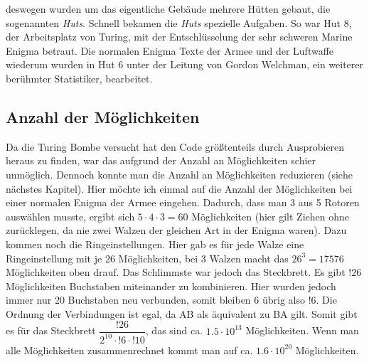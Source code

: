 deswegen wurden um das eigentliche Gebäude mehrere Hütten gebaut, die sogenannten \emph{Huts}. Schnell bekamen die \emph{Huts} spezielle Aufgaben. So war Hut 8, der Arbeitsplatz von Turing, mit der Entschlüsselung der sehr schweren Marine Enigma betraut. Die normalen Enigma Texte der Armee und der Luftwaffe wiederum wurden in Hut 6 unter der Leitung von Gordon Welchman, ein weiterer berühmter Statistiker, bearbeitet. \cite{enigmaproblem1} \cite{theessentialturing}

\subsection{Anzahl der Möglichkeiten}
Da die Turing Bombe versucht hat den Code größtenteils durch Ausprobieren heraus zu finden, war das aufgrund der Anzahl an Möglichkeiten schier unmöglich. Dennoch konnte man die Anzahl an Möglichkeiten reduzieren (siehe nächstes Kapitel). Hier möchte ich einmal auf die Anzahl der Möglichkeiten bei einer normalen Enigma der Armee eingehen. Dadurch, dass man 3 aus 5 Rotoren auswählen musste, ergibt sich $5 \cdot 4 \cdot 3 = 60$ Möglichkeiten (hier gilt Ziehen ohne zurücklegen, da nie zwei Walzen der gleichen Art in der Enigma waren). Dazu kommen noch die Ringeinstellungen. Hier gab es für jede Walze eine Ringeinstellung mit je 26 Möglichkeiten, bei 3 Walzen macht das $26^3 = 17576$ Möglichkeiten oben drauf. Das Schlimmste war jedoch das Steckbrett. Es gibt $!26$ Möglichkeiten Buchstaben miteinander zu kombinieren. Hier wurden jedoch immer nur 20 Buchstaben neu verbunden, somit bleiben 6 übrig also $!6$. Die Ordnung der Verbindungen ist egal, da AB als äquivalent zu BA gilt. Somit gibt es für das Steckbrett $\dfrac{!26}{2^{10}\cdot!6\cdot!10}$, das sind ca. $1.5 \cdot 10^{13}$ Möglichkeiten. Wenn man alle Möglichkeiten zusammenrechnet kommt man auf ca. $1.6 \cdot 10^{20}$ Möglichkeiten. \cite{emach}

